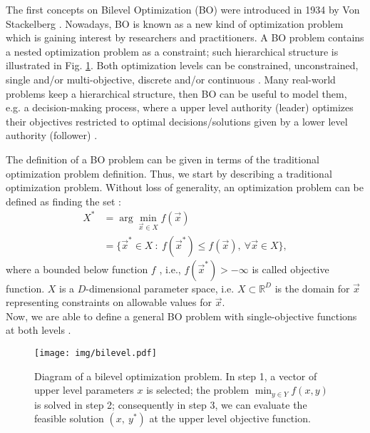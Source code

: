 \documentclass[conference]{IEEEtran}
\theoremstyle{definition}
\begin{document}
The first concepts on Bilevel Optimization (BO) were introduced in 1934 by Von
Stackelberg \cite{von2010market}. Nowadays, BO is known as a new kind of optimization
problem which is gaining interest by researchers and practitioners. A BO problem
contains a nested optimization problem as a constraint; such hierarchical structure
is illustrated in Fig. \ref{fig:bilevel}. Both optimization levels can be constrained,
unconstrained, single and/or multi-objective, discrete and/or continuous
\cite{bard2013practical,dempe2002foundations}. Many real-world problems keep a hierarchical
structure, then BO can be useful to model them, e.g. a decision-making process,
where a upper level authority (leader) optimizes their objectives restricted to
optimal decisions/solutions given by a  lower level authority (follower)
\cite{brotcorne2001bilevel,kalashnikov2010comparison,sinha2015transportation,von1945theory,wang2014bilevel}.

The definition of a BO problem can be given in terms of the traditional
optimization problem definition. Thus, we start by describing a traditional optimization
problem. Without loss of generality, an optimization problem can be defined as
finding the set \cite{chong2013introduction,rao2009engineering}:
% 
\begin{align}
    \label{eqn:Xargmin}
    X^* &= \arg \min_{\vec{x} \in X} f(\vec{x}) \\ \nonumber
    &= \{ \vec{x}^* \in X \ : \ f(\vec{x}^*) \leq f( \vec{x} ), \ 
    \forall
    \vec{x} \in X \},
\end{align}
% 
where a bounded below function $f$ , i.e., $f(\vec{x}^*)> -\infty$ is called objective
function. $X$ is a $D$-dimensional parameter space, i.e. $X \subset \mathbb{R}^D$
is the domain for $\vec{x}$ representing constraints on
allowable values for $\vec{x}$.\\

Now, we are able to define a general BO problem with
single-objective functions at both levels
\cite{bard2013practical,dempe2002foundations}.

\begin{figure}[t]
    \centering
    \texttt{[image: img/bilevel.pdf]}
    \caption{ Diagram of a bilevel optimization problem. In step 1, a vector of %
              upper level parameters $x$ is selected; the problem $\min_{y\in Y} %
              f(x, y)$ is solved in step 2; consequently in step 3, we can evaluate %
              the feasible solution $(x,\ y^*)$ at the upper level objective function. %
            }
    \label{fig:bilevel}
\end{figure}
% 
\end{document}
